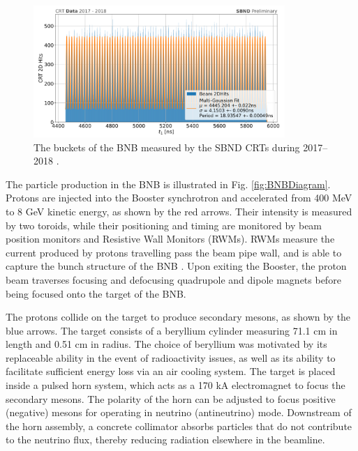 \begin{figure}[ht!] 
\centering    
\includegraphics[width=0.85\textwidth]{CRT2017}
\caption[Booster Neutrino Beam Measured by SBND CRTs in 2017-2018]{
The buckets of the BNB measured by the SBND CRTs during 2017--2018 \cite{CPAD2022}.
}
\label{fig:CRT2017}
\end{figure}

The particle production in the BNB is illustrated in Fig. \ref{fig:BNBDiagram}.
Protons are injected into the Booster synchrotron and accelerated from 400 MeV to 8 GeV kinetic energy, as shown by the red arrows. 
Their intensity is measured by two toroids, while their positioning and timing are monitored by beam position monitors and Resistive Wall Monitors (RWMs).
RWMs measure the current produced by protons travelling pass the beam pipe wall, and is able to capture the bunch structure of the BNB \cite{BNBRWM}.
Upon exiting the Booster, the proton beam traverses focusing and defocusing quadrupole and dipole magnets before being focused onto the target of the BNB.

The protons collide on the target to produce secondary mesons, as shown by the blue arrows.
The target consists of a beryllium cylinder measuring 71.1 cm in length and 0.51 cm in radius.
The choice of beryllium was motivated by its replaceable ability in the event of radioactivity issues, as well as its ability to facilitate sufficient energy loss via an air cooling system.
The target is placed inside a pulsed horn system, which acts as a 170 kA electromagnet to focus the secondary mesons.
The polarity of the horn can be adjusted to focus positive (negative) mesons for operating in neutrino (antineutrino) mode. 
Downstream of the horn assembly, a concrete collimator absorbs particles that do not contribute to the neutrino flux, thereby reducing radiation elsewhere in the beamline.

